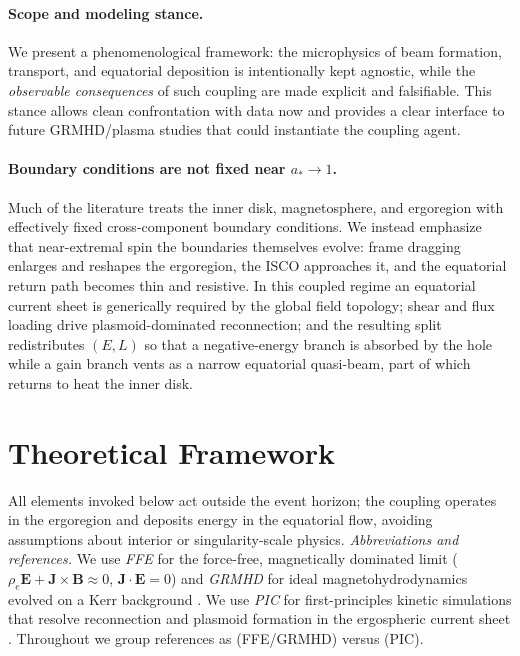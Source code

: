 \documentclass[twocolumn]{aastex701}
\begin{document}
\paragraph{Scope and modeling stance.}
We present a phenomenological framework: the microphysics of beam formation, transport, and equatorial deposition is intentionally kept agnostic, while the \emph{observable consequences} of such coupling are made explicit and falsifiable. This stance allows clean confrontation with data now and provides a clear interface to future GRMHD/plasma studies that could instantiate the coupling agent.

\paragraph{Boundary conditions are not fixed near $a_*\!\to\!1$.}
Much of the literature treats the inner disk, magnetosphere, and ergoregion with effectively fixed cross-component boundary conditions. We instead emphasize that near-extremal spin the boundaries themselves evolve: frame dragging enlarges and reshapes the ergoregion, the ISCO approaches it, and the equatorial return path becomes thin and resistive. In this coupled regime an equatorial current sheet is generically required by the global field topology; shear and flux loading drive plasmoid-dominated reconnection; and the resulting split redistributes $(E,L)$ so that a negative-energy branch is absorbed by the hole while a gain branch vents as a narrow equatorial quasi-beam, part of which returns to heat the inner disk.


\section{Theoretical Framework}\label{sec:theory}

\noindent All elements invoked below act outside the event horizon; the coupling operates in the ergoregion and deposits energy in the equatorial flow, avoiding assumptions about interior or singularity-scale physics.
\noindent\textit{Abbreviations and references.}
We use \emph{FFE} for the force-free, magnetically dominated limit ($\rho_e\mathbf{E}+\mathbf{J}\!\times\!\mathbf{B}\approx 0$, $\mathbf{J}\!\cdot\!\mathbf{E}=0$) and \emph{GRMHD} for ideal magnetohydrodynamics evolved on a Kerr background \citep{Komissarov2004MNRAS,GrallaJacobson2014MNRAS,EastYang2018PRD,Pan2018PRD}.
We use \emph{PIC} for first-principles kinetic simulations that resolve reconnection and plasmoid formation in the ergospheric current sheet \citep{Parfrey2019PRL,Bransgrove2021PRL}.
Throughout we group references as (FFE/GRMHD) versus (PIC).
\end{document}
